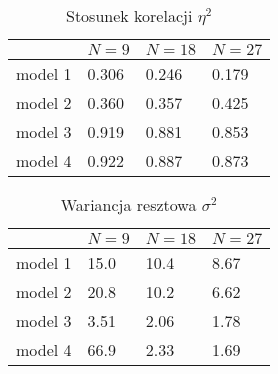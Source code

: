 \documentclass[11pt, a4paper]{article}
\begin{document}
\clearpage

\newpage

\begin{table}[p!]
	\centering
	\begin{tabularx}{0.7 \textwidth}{b||b|b|b}
		& $N = 9$ & $N = 18$ & $N = 27$ \\[5pt]
		\hline\hline
		model 1 &
			0.306 & 0.246 & 0.179 \\
		model 2 &
			0.360 & 0.357 & 0.425 \\
		model 3 &
			0.919 & 0.881 & 0.853 \\
		model 4 &
			0.922 & 0.887 & 0.873
	\end{tabularx}
	\caption{Stosunek korelacji $\eta^2$}
	\label{tbl:eta}
\end{table}

\begin{table}[p!]
	\centering
	\begin{tabularx}{0.7 \textwidth}{b||b|b|b}
		& $N = 9$ & $N = 18$ & $N = 27$ \\[5pt]
		\hline\hline
		model 1 &
			15.0 & 10.4 & 8.67 \\
		model 2 &
			20.8 & 10.2 & 6.62 \\
		model 3 &
			3.51 & 2.06 & 1.78 \\
		model 4 &
			66.9 & 2.33 & 1.69 \\
	\end{tabularx}
	\caption{Wariancja resztowa $\sigma^2$}
	\label{tbl:sigma}
\end{table}

\clearpage

\newpage
\end{document}
